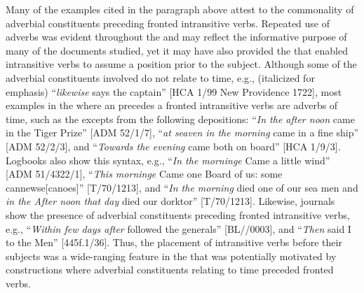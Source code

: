 Many of the examples cited in the paragraph above attest to the commonality of adverbial constituents preceding fronted intransitive verbs. Repeated use of adverbs was evident throughout the  and may reflect the informative purpose of many of the documents studied, yet it may have also provided the  that enabled intransitive verbs to assume a position prior to the  subject. Although some of the adverbial constituents involved do not relate to time, e.g., (italicized for emphasis) “\textit{likewise} says the captain” [HCA 1/99 New Providence 1722], most examples in the  where an  precedes a fronted intransitive verbs are adverbs of time, such as the excepts from the following depositions: “\textit{In the after noon} came in the Tiger Prize” [ADM 52/1/7], “\textit{at seaven in the morning} came in a fine ship” [ADM 52/2/3], and “\textit{Towards the evening} came both on board” [HCA 1/9/3]. Logbooks also show this syntax, e.g., “\textit{In the morninge} Came a little wind” [ADM 51/4322/1], “\textit{This morninge} Came one Board of us: some cannewse[canoes]” [T/70/1213], and “\textit{In the morning} died one of our sea men and \textit{in the After noon that day} died our dorktor” [T/70/1213]. Likewise, journals show the presence of adverbial constituents preceding fronted intransitive verbs, e.g., “\textit{Within few days after} followed the generals” [BL/\citealt{Egerton2395}/0003], and “\textit{Then} said I to the Men” [445f.1/36]. Thus, the placement of intransitive verbs before their  subjects was a wide-ranging feature in the  that was potentially motivated by constructions where adverbial constituents relating to time preceded fronted verbs.  

